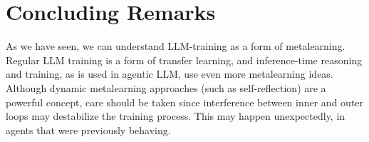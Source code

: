 \section{Concluding Remarks}
As we have seen, we can understand LLM-training as a  form of metalearning. Regular LLM training is a form of transfer learning, and inference-time reasoning and training, as is used in agentic LLM, use even more metalearning ideas. Although dynamic metalearning approaches (such as self-reflection) are a powerful concept,  care should be taken since interference between inner and outer loops may destabilize the training process. This may  happen unexpectedly, in agents that were previously behaving.

